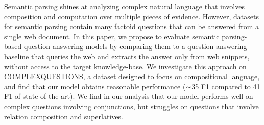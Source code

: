 Semantic parsing shines at analyzing complex natural language that involves composition and computation over multiple pieces of evidence. However, datasets for semantic parsing contain many factoid questions that can be answered from a single web document. In this paper, we propose to evaluate semantic parsing-based question answering models by comparing them to a question answering baseline that queries the web and extracts the answer only from web snippets, without access to the target knowledge-base. We investigate this approach on COMPLEXQUESTIONS, a dataset designed to focus on compositional language, and find that our model obtains reasonable performance (∼35 F1 compared to 41 F1 of state-of-the-art). We find in our analysis that our model performs well on complex questions involving conjunctions, but struggles on questions that involve relation composition and superlatives.
